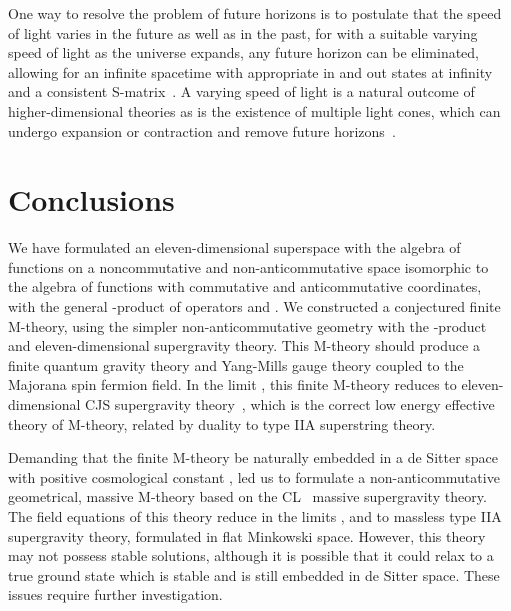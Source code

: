 \documentclass[a4paper,12pt]{article}
\begin{document}
One way to resolve the problem of future horizons is to postulate that the
speed of light varies in the future as well as in the past, for with a
suitable varying speed of light as the universe expands,
any future horizon can be eliminated, allowing for an infinite spacetime
with appropriate in and out states at infinity and a consistent
S-matrix~\cite{Moffat4}. A varying speed of light is a natural outcome of
higher-dimensional theories as is the existence of multiple light cones,
which can undergo expansion or contraction and remove future
horizons~\cite{Clayton,Drummond,Liberati}.

\section{Conclusions}

We have formulated an
eleven-dimensional superspace with the algebra of functions on
a noncommutative and non-anticommutative space
isomorphic to the algebra of functions with commutative \coordHE{} and
anticommutative \coordHE{} coordinates, with the general \coordHE{}-product of operators \coordHE{} and \coordHE{}. We
constructed a conjectured finite M-theory, using the simpler
non-anticommutative geometry with the \coordHE{}-product and eleven-dimensional
supergravity theory. This M-theory should produce a finite quantum gravity
theory and Yang-Mills gauge theory coupled to the Majorana spin
\coordHE{} fermion field. In the limit \coordHE{}, this finite M-theory reduces to eleven-dimensional CJS supergravity
theory~\cite{Julia}, which is the correct low energy effective theory of
M-theory, related by duality to type IIA superstring theory.

Demanding that the finite M-theory be naturally embedded in a de Sitter
space with positive cosmological constant \coordHE{}, led us to
formulate a non-anticommutative geometrical, massive M-theory based on the
CL~\cite{Lambert} massive supergravity theory.
The field equations of this theory reduce in the limits
\coordHE{}, \coordHE{} and
\coordHE{} to massless type IIA supergravity theory, formulated in
flat Minkowski space. However, this theory may not possess stable
solutions, although it is possible that it could relax to a true ground
state which is stable and is still embedded in de Sitter space. These
issues require further investigation.
\end{document}
